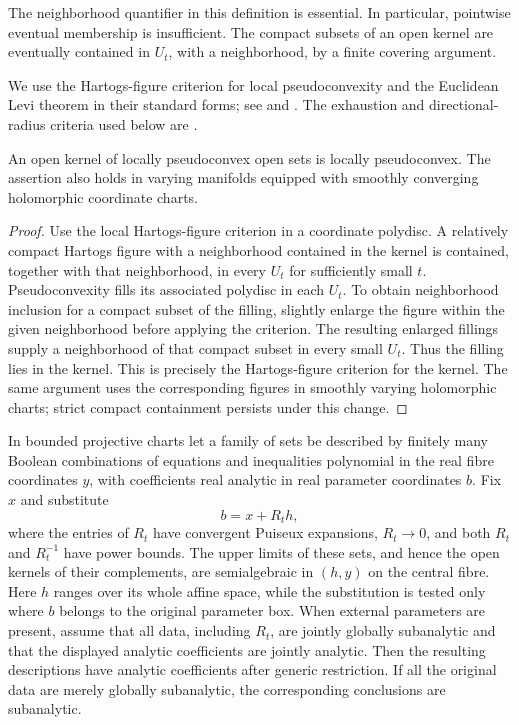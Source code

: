 The neighborhood quantifier in this definition is essential. In
particular, pointwise eventual membership is insufficient. The compact
subsets of an open kernel are eventually contained in $U_t$, with a
neighborhood, by a finite covering argument.

We use the Hartogs-figure criterion for local pseudoconvexity and the
Euclidean Levi theorem in their standard forms; see
\cite[II.3.4 and II.3.7]{FritzscheGrauert2002} and
\cite[VIII.9.11(a)]{Demailly2012}. The exhaustion and directional-radius
criteria used below are \cite[I.7.2]{Demailly2012}.

\begin{lemma}
\label{prep:kernel-pseudoconvexity}
An open kernel of locally pseudoconvex open sets is locally
pseudoconvex. The assertion also holds in varying manifolds equipped
with smoothly converging holomorphic coordinate charts.
\end{lemma}

\begin{proof}
Use the local Hartogs-figure criterion in a coordinate polydisc. A
relatively compact Hartogs figure with a neighborhood contained in
the kernel is contained, together with that neighborhood, in every
$U_t$ for sufficiently small $t$. Pseudoconvexity fills its associated
polydisc in each $U_t$. To obtain neighborhood inclusion for a compact
subset of the filling, slightly enlarge the figure within the given
neighborhood before applying the criterion. The resulting enlarged
fillings supply a neighborhood of that compact subset in every small
$U_t$. Thus the filling lies in the kernel. This is precisely the
Hartogs-figure criterion for the kernel. The same argument uses the
corresponding figures in smoothly varying holomorphic charts; strict
compact containment persists under this change.
\end{proof}

\begin{lemma}\label{prep:finite-jet-specialization}
In bounded projective charts let a family of sets be described by
finitely many Boolean combinations of equations and inequalities
polynomial in the real fibre coordinates $y$, with coefficients real
analytic in real parameter coordinates $b$. Fix $x$ and substitute
\[
 b=x+R_t h,
\]
where the entries of $R_t$ have convergent Puiseux expansions,
$R_t\to0$, and both $R_t$ and $R_t^{-1}$ have power bounds.
The upper limits of these sets, and hence the open kernels of their
complements, are semialgebraic in $(h,y)$ on the central fibre.
Here $h$ ranges over its whole affine space, while the substitution
is tested only where $b$ belongs to the original parameter box.
When external parameters are present, assume that all data, including
$R_t$, are jointly globally subanalytic and that the displayed
analytic coefficients are jointly analytic. Then the resulting
descriptions have analytic coefficients after generic restriction.
If all the original data are merely
globally subanalytic, the corresponding conclusions are subanalytic.
\end{lemma}

